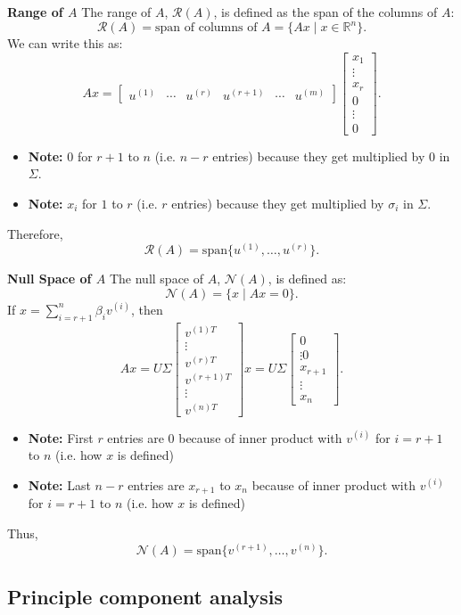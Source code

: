\begin{derivation}
    \textbf{Range of \( A \)}
    The range of \( A \), \( \mathcal{R}(A) \), is defined as the span of the columns of \( A \):
    \[
    \mathcal{R}(A) = \text{span of columns of } A = \{ A x \mid x \in \mathbb{R}^n \}.
    \]
    We can write this as:
    \[
    A x = 
    \begin{bmatrix}
    u^{(1)} & \cdots & u^{(r)} & u^{(r+1)} & \cdots & u^{(m)}
    \end{bmatrix}
    \begin{bmatrix}
    x_1 \\
    \vdots \\
    x_r \\
    0 \\
    \vdots \\
    0
    \end{bmatrix}.
    \]
    \begin{itemize}
        \item \textbf{Note:} $0$ for $r+1$ to $n$ (i.e. $n-r$ entries) because they get multiplied by $0$ in $\Sigma$. 
        \item \textbf{Note:} $x_i$ for $1$ to $r$ (i.e. $r$ entries) because they get multiplied by $\sigma_i$ in $\Sigma$.
    \end{itemize}
    Therefore,
    \[
    \mathcal{R}(A) = \text{span} \{ u^{(1)}, \dots, u^{(r)} \}.
    \]
    \vspace{1em}

    \textbf{Null Space of \( A \)}
    The null space of \( A \), \( \mathcal{N}(A) \), is defined as:
    \[
    \mathcal{N}(A) = \{ x \mid A x = 0 \}.
    \]
    If \( x = \sum_{i=r+1}^n \beta_i v^{(i)} \), then
    \[
    A x = U \Sigma 
    \begin{bmatrix}
    v^{(1) T} \\
    \vdots \\
    v^{(r) T} \\
    v^{(r+1) T} \\
    \vdots \\
    v^{(n) T}
    \end{bmatrix} x =  U \Sigma \begin{bmatrix}
        0 \\
        \vdots 
        0 \\
        x_{r+1} \\
        \vdots \\
        x_n
        \end{bmatrix}.
    \]
    \begin{itemize}
        \item \textbf{Note:} First $r$ entries are $0$ because of inner product with $v^{(i)}$ for $i=r+1$ to $n$ (i.e. how $x$ is defined)
        \item \textbf{Note:} Last $n-r$ entries are $x_{r+1}$ to $x_n$ because of inner product with $v^{(i)}$ for $i=r+1$ to $n$ (i.e. how $x$ is defined)
    \end{itemize}
    Thus,
    \[
    \mathcal{N}(A) = \text{span} \{ v^{(r+1)}, \dots, v^{(n)} \}.
    \]
\end{derivation}





\subsection{Principle component analysis}